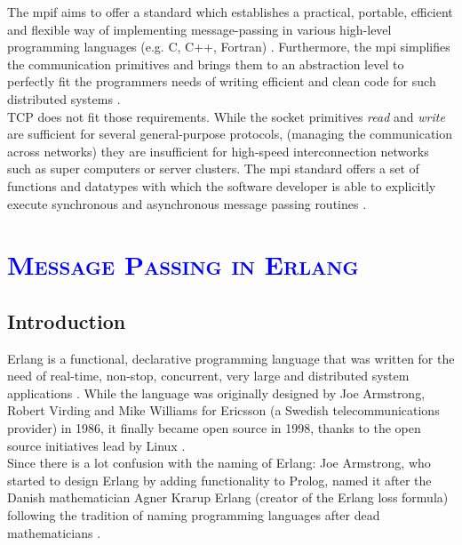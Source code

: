 \documentclass[xcolor=dvipsnames]{article}
\begin{document}
\noindent The \gls{mpif} aims to offer a standard which establishes a practical, portable, efficient and flexible way of implementing message-passing in various high-level programming languages (e.g. C, C++, Fortran) \cite[ch. History/iii]{mpi}. Furthermore, the \gls{mpi} simplifies the communication primitives and brings them to an abstraction level to perfectly fit the programmers needs of writing efficient and clean code for such distributed systems \cite{tanenbaum}.\\

\noindent TCP does not fit those requirements. While the socket primitives \textit{read} and \textit{write} are sufficient for several general-purpose protocols, (managing the communication across networks) they are insufficient for high-speed interconnection networks such as super computers or server clusters. The \gls{mpi} standard offers a set of functions and datatypes with which the software developer is able to explicitly execute synchronous and asynchronous message passing routines \cite[ch. 4.3 on p. 143]{tanenbaum}.\\

\section{\scshape{\textcolor{blue}{Message Passing in Erlang}}} \label{erlang}

\subsection{Introduction}

Erlang is a functional, declarative programming language that was written for the need of real-time, non-stop, concurrent, very large and distributed system applications \cite[chap. 1 / p. 1]{Armstrong96erlang}. While the language was originally designed by Joe Armstrong, Robert Virding and Mike Williams for Ericsson (a Swedish telecommunications provider) in 1986, it finally became open source in 1998, thanks to the open source initiatives lead by Linux \cite[chap. 8 on p. 39]{erl_history}.\\

\noindent Since there is a lot confusion with the naming of Erlang: Joe Armstrong, who started to design Erlang by adding functionality to Prolog, named it after the Danish mathematician Agner Krarup Erlang (creator of the Erlang loss formula) following the tradition of naming programming languages after dead mathematicians \cite[chap. 4.1 on p. 13]{erl_history}.\\
\end{document}
